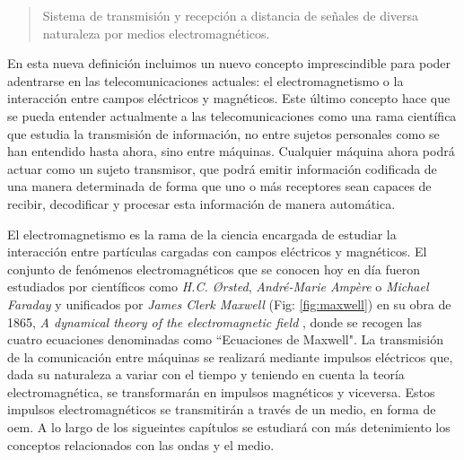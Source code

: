 \begin{quote}

\small Sistema de transmisión y recepción a distancia de señales de diversa naturaleza por medios electromagnéticos.

\end{quote}

\par En esta nueva definición incluimos un nuevo concepto imprescindible para poder adentrarse en las telecomunicaciones actuales: el electromagnetismo o la interacción entre campos eléctricos y magnéticos. Este último concepto hace que se pueda entender actualmente a las telecomunicaciones como una rama científica que estudia la transmisión de información, no entre sujetos personales como se han entendido hasta ahora, sino entre máquinas. Cualquier máquina  ahora podrá actuar como un sujeto transmisor, que podrá emitir información codificada de una manera determinada de forma que uno o más receptores sean capaces de recibir, decodificar y procesar esta información de manera automática.
\\
\par El electromagnetismo es la rama de la ciencia encargada de estudiar la interacción entre partículas cargadas con campos eléctricos y magnéticos. El conjunto de fenómenos electromagnéticos que se conocen hoy en día fueron estudiados por científicos como \textit{H.C. Ørsted}, \textit{André-Marie Ampère} o \textit{Michael Faraday} y unificados por \textit{James Clerk Maxwell} (Fig: \ref{fig:maxwell}) en su obra de 1865, \textit{A dynamical theory of the electromagnetic field} \cite{JamesClerkMaxwell1996}, donde se recogen las cuatro ecuaciones denominadas como ``Ecuaciones de Maxwell". La transmisión de la comunicación entre máquinas se realizará mediante impulsos eléctricos que, dada su naturaleza a variar con el tiempo y teniendo en cuenta la teoría electromagnética, se transformarán en impulsos magnéticos y viceversa. Estos impulsos electromagnéticos se transmitirán a través de un medio, en forma de \gls{oem}. A lo largo de los sigueintes capítulos se estudiará con más detenimiento los conceptos relacionados con las ondas y el medio.

